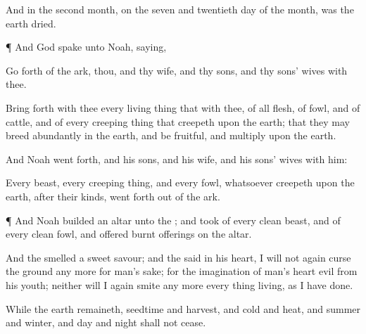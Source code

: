 {And in the
second
month, on the
seven and
twentieth
day of the
month, was the
earth
dried.


\par }{\PP {}¶ And
God
spake unto
Noah,
saying,

Go
forth of the
ark, thou, and thy
wife, and thy
sons, and thy
sons’
wives with thee.

Bring
forth with thee every living
thing that
{} with thee, of all
flesh,
{} of
fowl, and of
cattle, and of every creeping
thing that
creepeth upon the
earth; that they may breed
abundantly in the
earth, and be
fruitful, and
multiply upon the
earth.

And
Noah went
forth, and his
sons, and his
wife, and his
sons’
wives with him:

Every
beast, every creeping
thing, and every
fowl,
{}
whatsoever
creepeth upon the
earth, after their
kinds, went
forth out of the
ark.


\par }{\PP {}¶ And
Noah
builded an
altar unto the
{}; and
took of every
clean
beast, and of every
clean
fowl, and
offered burnt
offerings on the
altar.

And the
{}
smelled a
sweet
savour; and the
{}
said
in his
heart, I will not
again
curse the
ground any more for
man’s
sake; for the
imagination of
man’s
heart
{}
evil from his
youth; neither will I
again
smite any more every thing
living, as I have
done.

While the
earth
remaineth,
seedtime and
harvest, and
cold and
heat, and
summer and
winter, and
day and
night shall not
cease.




\par }
